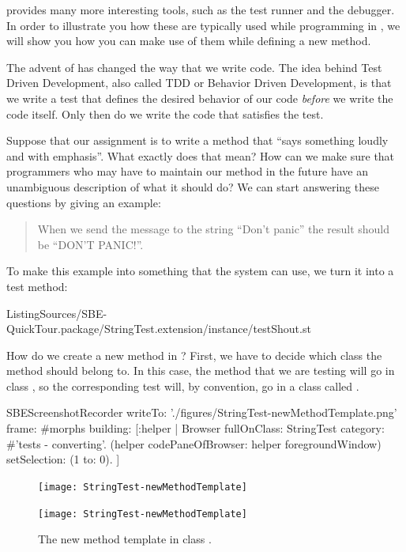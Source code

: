 \documentclass[a4paper,10pt,twoside]{book}
\begin{document}
\sq provides many more interesting tools, such as the test runner and the debugger.
In order to illustrate you how these are typically used while programming in \sq, we will show you how you can make use of them while defining a new method.

The advent of \cite{Beck03a} has changed the way that we write code.
The idea behind Test Driven Development, also called TDD or Behavior Driven Development, is that we write a test that defines the desired behavior of our code \emph{before} we write the code itself.
Only then do we write the code that satisfies the test.

Suppose that our assignment is to write a method that ``says something loudly and with emphasis''.
What exactly does that mean?
How can we make sure that programmers who may have to maintain our method in the future have an unambiguous description of what it should do?
We can start answering these questions by giving an example:

\begin{quote}
When we send the message  to the string ``Don't panic'' the result should be ``DON'T PANIC!''.
\end{quote}

\noindent
To make this example into something that the system can use, we turn it into a test method:

%
{ListingSources/SBE-QuickTour.package/StringTest.extension/instance/testShout.st}

How do we create a new method in \sq?
First, we have to decide which class the method should belong to.
In this case, the  method that we are testing will go in class , so the corresponding test will, by convention, go in a class called .

\begin{ExecuteSmalltalkScript}
SBEScreenshotRecorder writeTo: './figures/StringTest-newMethodTemplate.png' frame: #morphs building: [:helper |
	Browser fullOnClass: StringTest category: #'tests - converting'.
	(helper codePaneOfBrowser: helper foregroundWindow) setSelection: (1 to: 0).
]
\end{ExecuteSmalltalkScript}


\begin{figure}[hbt]
\ifluluelse
	{\centerline {\texttt{[image: StringTest-newMethodTemplate]}}}
	{\centerline {\texttt{[image: StringTest-newMethodTemplate]}}}
\caption{The new method template in class .
\label{fig:newMethodTemplate}}
\end{figure}
\end{document}
